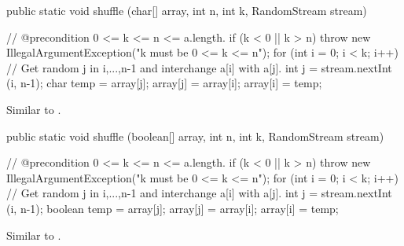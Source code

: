 \begin{htmlonly}
\end{htmlonly}
\begin{code}

   public static void shuffle (char[] array, int n, int k,
                               RandomStream stream)\begin{hide} {
      // @precondition 0 <= k <= n <= a.length.
      if (k < 0 || k > n)
         throw new IllegalArgumentException("k must be   0 <= k <= n");
      for (int i = 0; i < k; i++) {
         // Get random j in {i,...,n-1} and interchange a[i] with a[j].
         int j = stream.nextInt (i, n-1);
         char temp = array[j];
         array[j] = array[i];
         array[i] = temp;
      }
   }\end{hide}
\end{code}
\begin{tabb} Similar to 
 .
\end{tabb}
\begin{htmlonly}
\end{htmlonly}
\begin{code}

   public static void shuffle (boolean[] array, int n, int k,
                               RandomStream stream)\begin{hide} {
      // @precondition 0 <= k <= n <= a.length.
      if (k < 0 || k > n)
         throw new IllegalArgumentException("k must be   0 <= k <= n");
      for (int i = 0; i < k; i++) {
         // Get random j in {i,...,n-1} and interchange a[i] with a[j].
         int j = stream.nextInt (i, n-1);
         boolean temp = array[j];
         array[j] = array[i];
         array[i] = temp;
      }
   }\end{hide}
\end{code}
\begin{tabb} Similar to 
 .
\end{tabb}
\begin{htmlonly}
\end{htmlonly}
